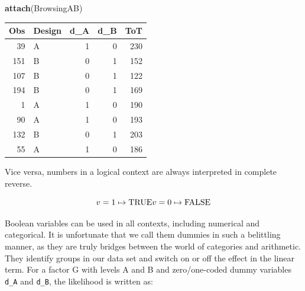 \documentclass[]{svmono}
\newenvironment{Shaded}{\begin{snugshade}}{\end{snugshade}}
\newcommand{\KeywordTok}[1]{\textcolor[rgb]{0.13,0.29,0.53}{\textbf{#1}}}
\newcommand{\DataTypeTok}[1]{\textcolor[rgb]{0.13,0.29,0.53}{#1}}
\newcommand{\DecValTok}[1]{\textcolor[rgb]{0.00,0.00,0.81}{#1}}
\newcommand{\StringTok}[1]{\textcolor[rgb]{0.31,0.60,0.02}{#1}}
\newcommand{\OperatorTok}[1]{\textcolor[rgb]{0.81,0.36,0.00}{\textbf{#1}}}
\newcommand{\NormalTok}[1]{#1}
\theoremstyle{definition}
\theoremstyle{definition}
\theoremstyle{definition}
\theoremstyle{remark}
\begin{document}
\begin{Shaded}
\begin{Highlighting}[]
\KeywordTok{attach}\NormalTok{(BrowsingAB)}
\end{Highlighting}
\end{Shaded}

\begin{Shaded}
\end{Shaded}

\begin{tabular}{r|l|r|r|r}
\hline
Obs & Design & d\_A & d\_B & ToT\\
\hline
39 & A & 1 & 0 & 230\\
\hline
151 & B & 0 & 1 & 152\\
\hline
107 & B & 0 & 1 & 122\\
\hline
194 & B & 0 & 1 & 169\\
\hline
1 & A & 1 & 0 & 190\\
\hline
90 & A & 1 & 0 & 193\\
\hline
132 & B & 0 & 1 & 203\\
\hline
55 & A & 1 & 0 & 186\\
\hline
\end{tabular}

Vice versa, numbers in a logical context are always interpreted in
complete reverse.

\[ 
v = 1 \mapsto \mathrm{TRUE}\\ v = 0 \mapsto \mathrm{FALSE} 
\]

Boolean variables can be used in all contexts, including numerical and
categorical. It is unfortunate that we call them dummies in such a
belittling manner, as they are truly bridges between the world of
categories and arithmetic. They identify groups in our data set and
switch on or off the effect in the linear term. For a factor G with
levels A and B and zero/one-coded dummy variables \texttt{d\_A} and
\texttt{d\_B}, the likelihood is written as:
\end{document}
